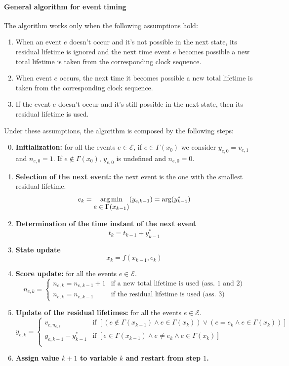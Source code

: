 \documentclass[12pt,a4paper]{article}
\DeclareMathOperator*{\argmin}{arg\,min}
\begin{document}
\paragraph{General algorithm for event timing} The algorithm works only when the following assumptions hold:
\begin{enumerate}
\item When an event $e$ doesn’t occur and it’s not possible in the next state, its residual lifetime is ignored and the next time event $e$ becomes possible a new total lifetime is taken from the corresponding clock sequence.
\item When event $e$ occurs, the next time it becomes possible a new total lifetime is taken from the corresponding clock sequence.
\item If the event $e$ doesn’t occur and it’s still possible in the next state, then its residual lifetime is used.
\end{enumerate}
\noindent
Under these assumptions, the algorithm is composed by the following steps:
\begin{enumerate}
\setcounter{enumi}{-1}
\item \textbf{Initialization:} for all the events $e\in\mathcal{E}$, if $e\in\Gamma(x_0)$ we consider $y_{e,0}=v_{e,1}$ and $n_{e,0}=1$. If $e\notin\Gamma(x_0)$, $y_{e,0}$ is undefined and $n_{e,0}=0$.
\item \textbf{Selection of the next event:} the next event is the one with the smallest residual lifetime.
$$
e_k = \argmin\limits_{\mathlarger{e\in\Gamma(x_{k-1})}} (y_{e,k-1}) = \text{arg} (y_{k-1}^*)
$$
\item \textbf{Determination of the time instant of the next event}
$$
t_k=t_{k-1}+y_{k-1}^*
$$
\item \textbf{State update}
$$
x_{k}=f(x_{k-1},e_{k})
$$
\item \textbf{Score update:}
for all the events $e\in\mathcal{E}$.
$$
n_{e,k}=
\begin{cases}
n_{e,k} = n_{e,k-1}+1 & \text{if a new total lifetime is used (ass. 1 and 2)} \\
n_{e,k} = n_{e,k-1} & \text{if the residual lifetime is used (ass. 3)}
\end{cases}
$$
\item \textbf{Update of the residual lifetimes:}
for all the events $e\in\mathcal{E}$.
$$
y_{e,k}=
\begin{cases}
v_{e,n_{e,k}} & \text{if } \left[\left(e\notin\Gamma(x_{k-1})\wedge e\in\Gamma(x_{k})\right)\vee\left(e=e_{k} \wedge e\in \Gamma(x_{k})\right)\right] \\
y_{e,k-1}-y_{k-1}^{*} & \text{if } \left[e\in\Gamma(x_{k-1})\wedge e\neq e_{k} \wedge e\in\Gamma(x_{k}) \right] \\
\end{cases}
$$
\item \textbf{Assign value $k+1$ to variable $k$ and restart from step $1$.}
\end{enumerate}
\newpage
\end{document}
